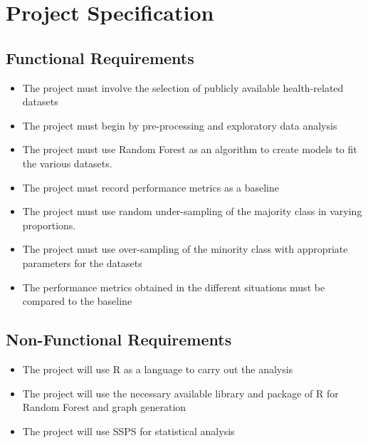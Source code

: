 \chapter{Project Specification}
\section{Functional Requirements}
\begin{itemize}
    \item The project must involve the selection of publicly available health-related datasets
    \item The project must begin by pre-processing and exploratory data analysis
    \item The project must use Random Forest as an algorithm to create models to fit the various datasets.
    \item The project must record performance metrics as a baseline
    \item The project must use random under-sampling of the majority class in varying proportions.
    \item The project must use over-sampling of the minority class with appropriate parameters for the datasets 
    \item The performance metrics obtained in the different situations must be compared to the baseline
\end{itemize}

\section{Non-Functional Requirements}
\begin{itemize}
    \item The project will use R as a language to carry out the analysis
    \item The project will use the necessary available library and package of R for Random Forest and graph generation
    \item The project will use SSPS for statistical analysis
\end{itemize}

